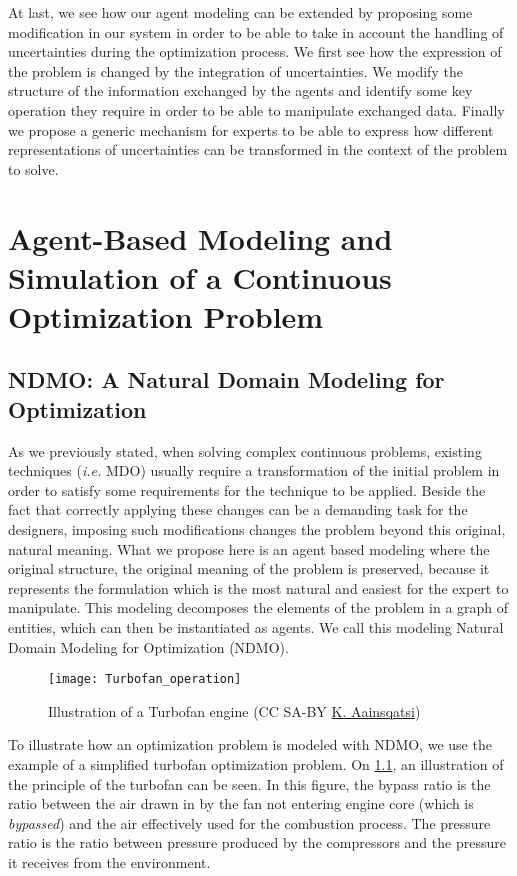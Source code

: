 At last, we see how our agent modeling can be extended by proposing some modification in our system in order to be able to take in account the handling of uncertainties during the optimization process. We first see how the expression of the problem is changed by the integration of uncertainties. We modify the structure of the information exchanged by the agents and identify some key operation they require in order to be able to manipulate exchanged data. Finally we propose a generic mechanism for experts to be able to express how different representations of uncertainties can be transformed in the context of the problem to solve.

\chapter{Agent-Based Modeling and Simulation of a Continuous Optimization Problem}

\section{NDMO: A Natural Domain Modeling for Optimization}\label{modeling}

As we previously stated, when solving complex continuous problems, existing techniques (\emph{i.e.} MDO) usually require a transformation of the initial problem in order to satisfy some requirements for the technique to be applied. Beside the fact that correctly applying these changes can be a demanding task for the designers, imposing such modifications changes the problem beyond this original, natural meaning. What we propose here is an agent based modeling where the original structure, the original meaning of the problem is preserved, because it represents the formulation which is the most natural and easiest for the expert to manipulate. This modeling decomposes the elements of the problem in a graph of entities, which can then be instantiated as agents. We call this modeling Natural Domain Modeling for Optimization (NDMO).

\begin{figure}[]
	\centering
	\texttt{[image: Turbofan\_operation]}
	\caption{Illustration of a Turbofan engine (CC SA-BY  \href{http://en.wikipedia.org/wiki/File:Turbofan_operation.svg}{K. Aainsqatsi})}
	\label{turbofan_illu}
\end{figure}

To illustrate how an optimization problem is modeled with NDMO, we use the example of a simplified turbofan optimization problem. On \figurename{} \ref{turbofan_illu}, an illustration of the principle of the turbofan can be seen. In this figure, the bypass ratio is the ratio between the air drawn in by the fan not entering engine core (which is \emph{bypassed}) and the air effectively used for the combustion process. The pressure ratio is the ratio between pressure produced by the compressors and the pressure it receives from the environment.

